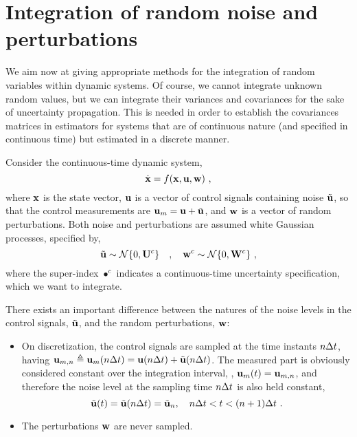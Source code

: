 
\section{Integration of random noise and perturbations}
\label{sec:IntNoise}

We aim now at giving appropriate methods for the integration of random variables within dynamic systems. 
Of course, we cannot integrate unknown random values, but we can integrate their variances and covariances for the sake of uncertainty propagation. 
This is needed in order to establish the covariances matrices in estimators for systems that are of continuous nature (and specified in continuous time) but estimated in a discrete manner.

Consider the continuous-time dynamic system,
%
\begin{equation}
\dot{{\bf x}} = f({\bf x},{\bf u},{\bf w})~,
\label{equ:contSysWithNoise}
\end{equation}
%
where ${\bf x}$ is the state vector, ${\bf u}$ is a vector of  control signals containing noise $\tilde{{\bf u}}$, so that the control measurements are ${\bf u}_m={\bf u}+\tilde{{\bf u}}$, and ${\bf w}$ is a vector of random perturbations. 
Both noise and perturbations are assumed white Gaussian processes, specified by,
%
\begin{equation}
\tilde{{\bf u}} \sim \mathcal{N}\{0,{\bf U}^c\} \quad , \quad {\bf w}^c\sim\mathcal{N}\{0,{\bf W}^c\}~,
\end{equation}
%
where the super-index $\bullet^c$ indicates a continuous-time uncertainty specification, which we want to integrate. 

There exists an important difference between the natures of the noise levels in the control signals, $\tilde{{\bf u}}$, and the random perturbations, ${\bf w}$:
%
\begin{itemize}
\item 
On discretization, the control signals are sampled at the time instants $n\Delta t$, having ${\bf u}_{m,n}\triangleq{\bf u}_m(n\Delta t)={\bf u}(n\Delta t)+\tilde{{\bf u}}(n\Delta t)$. 
The measured part is obviously considered constant over the integration interval, \ie, ${\bf u}_m(t)={\bf u}_{m,n}$, and therefore the noise level at the sampling time $n\Delta t$ is also held constant,
%
\begin{equation}
\tilde{{\bf u}}(t)=\tilde{{\bf u}}(n\Delta t) = \tilde{{\bf u}}_n, \quad n\Delta t<t<(n+1)\Delta t~. \label{equ:uint}
\end{equation}
%
\item  
The perturbations ${\bf w}$ are never sampled. 

\end{itemize}
%



